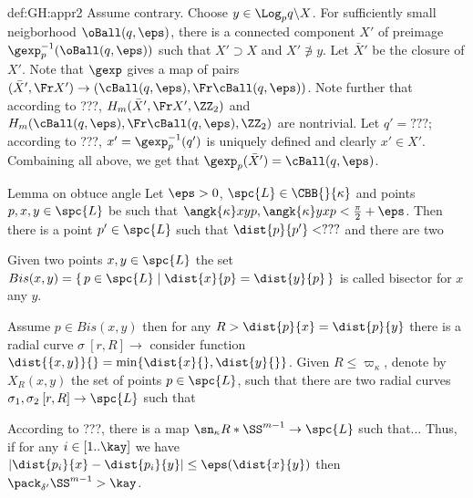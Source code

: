 {\begin{subthm}{def:GH:appr2}
Assume contrary.
Choose $y\in \Log_pq\backslash X$.
For sufficiently small neigborhood $\oBall(q,\eps)$, 
there is a connected component $X'$ of preimage $\gexp_p^{-1}(\oBall(q,\eps))$
such that $X'\supset X$ and $X'\not\ni y$. 
Let $\bar X'$ be the closure of $X'$.
Note that $\gexp$ gives a map of pairs $(\bar X',\Fr X')\to (\cBall(q,\eps),\Fr \cBall(q,\eps))$.
Note further that according to ???, $H_m(\bar X',\Fr X',\ZZ_2)$ and $H_m(\cBall(q,\eps),\Fr \cBall(q,\eps),\ZZ_2)$ are nontrivial.
Let $q'=???$; according to ???, $x'=\gexp_p^{-1}(q')$ is uniquely defined and clearly $x'\in X'$.
Combaining all above, we get that $\gexp_p(\bar X')=\cBall(q,\eps)$.
\qeds

































\begin{thm}{Lemma on obtuce angle}
Let $\eps>0$,
$\spc{L}\in\CBB{}{\kappa}$ 
and points $p,x,y\in\spc{L}$ be such that 
$\angk{\kappa}xyp,\angk{\kappa}yxp<\tfrac\pi2+\eps$.
Then there is a point $p'\in\spc{L}$ such that 
$\dist{p}{p'}<???$
and there are two 
\end{thm}


Given two points $x,y\in \spc{L}$ 
the set 
$Bis(x,y)
=
\{\,p\in\spc{L}
\mid
\dist{x}{p}=\dist{y}{p}\,\}$
is called bisector for $x$ any $y$.

Assume $p\in Bis(x,y)$ then for any $R>\dist{p}{x}=\dist{p}{y}$ there is a radial curve $\sigma\:[r,R]\to$
consider function $\dist{\{x,y\}}{}=\min\{\dist{x}{},\dist{y}{}\}$.
Given $R\le \varpi_\kappa$,
denote by $X_R(x,y)$ the set of points $p\in\spc{L}$,
 such that there are two radial curves $\sigma_1,\sigma_2\:[r,R]\to\spc{L}$ such that 

According to ???, there is a map $\sn_\kappa R*\SS^{m-1}\to\spc{L}$ such that...
Thus, if for any $i\in[1..\kay]$ we have $|\dist{p_i}{x}-\dist{p_i}{y}|\le\eps(\dist{x}{y})$
then $\pack_{\delta'}\SS^{m-1}>\kay$. 
 

\end{subthm}}
